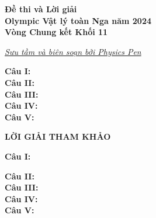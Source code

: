 \documentclass[12pt]{article}
\begin{document}
\thispagestyle{plain}

\begin{center}
  \LARGE{\textbf{Đề thi và Lời giải\\ Olympic Vật lý toàn Nga năm 2024\\Vòng Chung kết Khối 11}}
\end{center}
\begin{center}
  \large\textit{\href{https://facebook.com}{Sưu tầm và biên soạn bởi Physics Pen}}
\end{center}

\vspace{1cm}

\noindent\textbf{Câu I:}\\


\noindent\textbf{Câu II:}\\


\noindent\textbf{Câu III:}\\


\noindent\textbf{Câu IV:}\\


\noindent\textbf{Câu V:}\\


\newpage

\begin{center}
  \Large{\textbf{LỜI GIẢI THAM KHẢO}}
\end{center}

\vspace{5mm}
\noindent\textbf{Câu I:}\\

\newpage

\noindent\textbf{Câu II:}\\


\noindent\textbf{Câu III:}\\


\noindent\textbf{Câu IV:}\\


\noindent\textbf{Câu V:}\\

\end{document}
